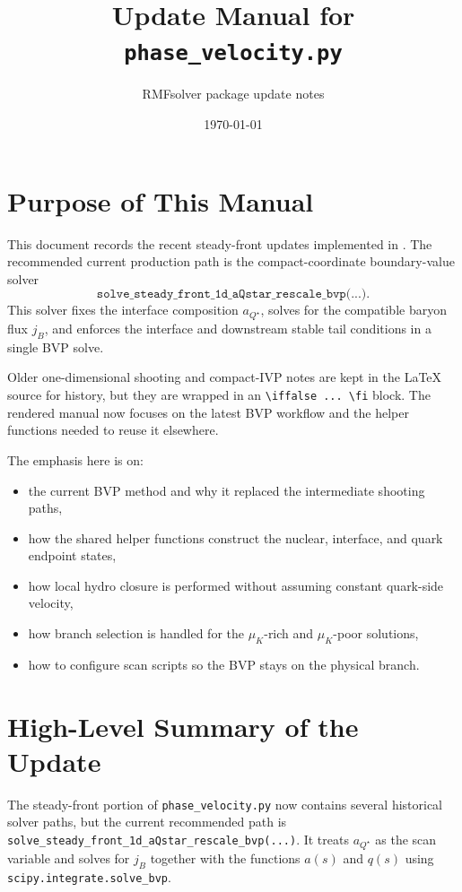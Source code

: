 \documentclass[11pt]{article}
\title{Update Manual for \texttt{phase\_velocity.py}}
\author{RMFsolver package update notes}
\date{\today}
\newcommand{\codepath}[1]{\path{#1}}
\begin{document}
\maketitle


\section{Purpose of This Manual}
This document records the recent steady-front updates implemented in
\codepath{RMFsolver/phase_velocity.py}. The recommended current production path
is the compact-coordinate boundary-value solver
\[
\texttt{solve\_steady\_front\_1d\_aQstar\_rescale\_bvp(...)}.
\]
This solver fixes the interface composition $a_{Q^\star}$, solves for the
compatible baryon flux $j_B$, and enforces the interface and downstream stable
tail conditions in a single BVP solve.

Older one-dimensional shooting and compact-IVP notes are kept in the \LaTeX{}
source for history, but they are wrapped in an \texttt{\textbackslash iffalse ...
\textbackslash fi} block. The rendered manual now focuses on the latest BVP
workflow and the helper functions needed to reuse it elsewhere.

The emphasis here is on:
\begin{itemize}[leftmargin=1.5em]
\item the current BVP method and why it replaced the intermediate shooting paths,
\item how the shared helper functions construct the nuclear, interface, and
      quark endpoint states,
\item how local hydro closure is performed without assuming constant quark-side
      velocity,
\item how branch selection is handled for the $\mu_K$-rich and $\mu_K$-poor
      solutions,
\item how to configure scan scripts so the BVP stays on the physical branch.
\end{itemize}

\section{High-Level Summary of the Update}
The steady-front portion of \texttt{phase\_velocity.py} now contains several
historical solver paths, but the current recommended path is
\texttt{solve\_steady\_front\_1d\_aQstar\_rescale\_bvp(...)}.
It treats $a_{Q^\star}$ as the scan variable and solves for $j_B$ together with
the functions $a(s)$ and $q(s)$ using \texttt{scipy.integrate.solve\_bvp}.
\end{document}
